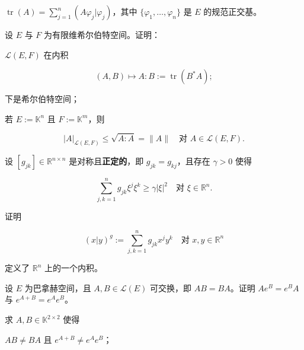\begin{exercises}
\begin{subitems}
\item

$ \operatorname{tr}(A) = \sum_{j=1}^{n} (A\varphi_j|\varphi_j) $，其中 $ \{\varphi_1, \ldots, \varphi_n\} $ 是 $ E $ 的规范正交基。

\end{subitems}

\item

设 $ E $ 与 $ F $ 为有限维希尔伯特空间。证明：

\begin{subitems}
\item

$ \mathcal{L}(E, F) $ 在内积

\[
(A, B) \mapsto A : B := \operatorname{tr}(B^{*}A) ;
\]

下是希尔伯特空间；

\item

若 $ E := \mathbb{K}^{n} $ 且 $ F := \mathbb{K}^{m} $，则

\[
|A|_{\mathcal{L}(E, F)} \le \sqrt{A : A} = \|A\| \quad \text{对 } A \in \mathcal{L}(E, F) .
\]
\end{subitems}

\item

设 $ [g_{jk}] \in \mathbb{R}^{n \times n} $ 是对称且\textbf{正定的}，即 $ g_{jk} = g_{kj} $，且存在 $ \gamma > 0 $ 使得

\[
\sum_{j,k=1}^{n} g_{jk}\xi^{j}\xi^{k} \ge \gamma|\xi|^{2} \quad \text{对 } \xi \in \mathbb{R}^{n} .
\]

证明

\[
(x|y)^{g} := \sum_{j,k=1}^{n} g_{jk}x^{j}y^{k} \quad \text{对 } x, y \in \mathbb{R}^{n}
\]

定义了 $ \mathbb{R}^{n} $ 上的一个内积。

\item

设 $ E $ 为巴拿赫空间，且 $ A, B \in \mathcal{L}(E) $ 可交换，即 $ AB = BA $。证明 $ Ae^{B} = e^{B}A $ 与 $ e^{A+B} = e^{A}e^{B} $。

\item

求 $ A, B \in \mathbb{K}^{2 \times 2} $ 使得

\begin{subitems}
\item

$ AB \ne BA $ 且 $ e^{A+B} \ne e^{A}e^{B} $；


\end{subitems}
\end{exercises}
